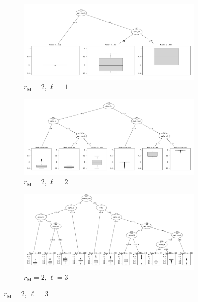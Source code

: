 \documentclass[10pt]{article}
\theoremstyle{definition}
\newcommand{\mooreRange}{r_\mathrm{M}}
\begin{document}
\begin{figure}[!ht]
\begin{subfigure}[b]{.45\textwidth}
    \end{subfigure}
    \begin{subfigure}[b]{.45\textwidth}
\includegraphics[width=\textwidth,trim={1cm 1cm 1cm 0cm},clip]{../cellular_automata/results/cart/m2_l1_tree.pdf}
\caption{$\mooreRange=2$, $\ell=1$}
    \end{subfigure}
    \begin{subfigure}[b]{.45\textwidth}
\includegraphics[width=\textwidth,trim={1cm 1cm 1cm 0cm},clip]{../cellular_automata/results/cart/m2_l2_tree.pdf}
\caption{$\mooreRange=2$, $\ell=2$}
    \end{subfigure}
    \begin{subfigure}[b]{.45\textwidth}
\includegraphics[width=\textwidth,trim={1cm 1cm 1cm 0cm},clip]{../cellular_automata/results/cart/m2_l3_tree.pdf}
\caption{$\mooreRange=2$, $\ell=3$}

\end{subfigure}
\end{figure}
\end{document}
